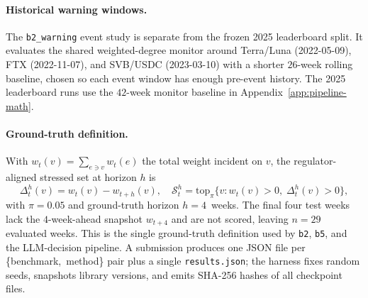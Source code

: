 \paragraph{Historical warning windows.}
The \texttt{b2\_warning} event study is separate from the frozen 2025
leaderboard split. It evaluates the shared weighted-degree monitor around
Terra/Luna (2022-05-09), FTX (2022-11-07), and SVB/USDC (2023-03-10) with a
shorter $26$-week rolling baseline, chosen so each event window has enough
pre-event history. The 2025 leaderboard runs use the $42$-week monitor
baseline in Appendix~\ref{app:pipeline-math}.

\paragraph{Ground-truth definition.}
With $w_t(v)\!=\!\sum_{e\ni v}w_t(e)$ the total weight incident on $v$, the
regulator-aligned stressed set at horizon $h$ is
\begin{equation}
\Delta_t^h(v)\!=\!w_t(v)\!-\!w_{t+h}(v),\quad
\mathcal{S}_t^h \!=\! \mathrm{top}_{\pi}\bigl\{ v : w_t(v)\!>\!0,\;
                                              \Delta_t^h(v)\!>\!0 \bigr\},
\label{eq:stressed-app}
\end{equation}
with $\pi\!=\!0.05$ and ground-truth horizon $h\!=\!4$~weeks. The final
four test weeks lack the $4$-week-ahead snapshot $w_{t+4}$ and are not
scored, leaving $n\!=\!29$ evaluated weeks. This is the single ground-truth
definition used by \texttt{b2}, \texttt{b5}, and the LLM-decision pipeline.
A submission produces one JSON file per \{benchmark,~method\} pair plus a
single \texttt{results.json}; the harness fixes random seeds, snapshots
library versions, and emits SHA-256 hashes of all checkpoint files.

